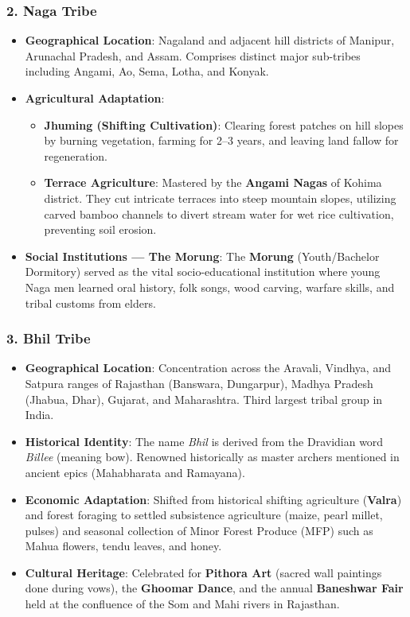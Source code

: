 \documentclass[11pt,a4paper]{article}
\begin{document}
\subsubsection{2. Naga Tribe}
\begin{itemize}[leftmargin=*]
  \item \textbf{Geographical Location}: Nagaland and adjacent hill districts of Manipur, Arunachal Pradesh, and Assam. Comprises distinct major sub-tribes including Angami, Ao, Sema, Lotha, and Konyak.
  \item \textbf{Agricultural Adaptation}:
  \begin{itemize}
    \item \textbf{Jhuming (Shifting Cultivation)}: Clearing forest patches on hill slopes by burning vegetation, farming for 2--3 years, and leaving land fallow for regeneration.
    \item \textbf{Terrace Agriculture}: Mastered by the \textbf{Angami Nagas} of Kohima district. They cut intricate terraces into steep mountain slopes, utilizing carved bamboo channels to divert stream water for wet rice cultivation, preventing soil erosion.
  \end{itemize}
  \item \textbf{Social Institutions --- The Morung}: The \textbf{Morung} (Youth/Bachelor Dormitory) served as the vital socio-educational institution where young Naga men learned oral history, folk songs, wood carving, warfare skills, and tribal customs from elders.
\end{itemize}

\subsubsection{3. Bhil Tribe}
\begin{itemize}[leftmargin=*]
  \item \textbf{Geographical Location}: Concentration across the Aravali, Vindhya, and Satpura ranges of Rajasthan (Banswara, Dungarpur), Madhya Pradesh (Jhabua, Dhar), Gujarat, and Maharashtra. Third largest tribal group in India.
  \item \textbf{Historical Identity}: The name \textit{Bhil} is derived from the Dravidian word \textit{Billee} (meaning bow). Renowned historically as master archers mentioned in ancient epics (Mahabharata and Ramayana).
  \item \textbf{Economic Adaptation}: Shifted from historical shifting agriculture (\textbf{Valra}) and forest foraging to settled subsistence agriculture (maize, pearl millet, pulses) and seasonal collection of Minor Forest Produce (MFP) such as Mahua flowers, tendu leaves, and honey.
  \item \textbf{Cultural Heritage}: Celebrated for \textbf{Pithora Art} (sacred wall paintings done during vows), the \textbf{Ghoomar Dance}, and the annual \textbf{Baneshwar Fair} held at the confluence of the Som and Mahi rivers in Rajasthan.
\end{itemize}
\end{document}
